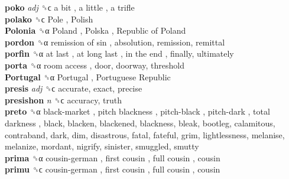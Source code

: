 \textbf{poko} \emph{adj}  ␝ϲ   a bit ,  a little ,  a trifle   \\
\textbf{polako} ␝ϲ   Pole ,  Polish   \\
\textbf{Polonia} ␝α   Poland ,  Polska ,  Republic of Poland   \\
\textbf{pordon} ␝α   remission of sin , absolution, remission, remittal  \\
\textbf{porfin} ␝α   at last ,  at long last ,  in the end , finally, ultimately  \\
\textbf{porta} ␝α   room access , door, doorway, threshold  \\
\textbf{Portugal} ␝α   Portugal ,  Portuguese Republic   \\
\textbf{presis} \emph{adj}  ␝ϲ  accurate, exact, precise  \\
\textbf{presishon} \emph{n}  ␝ϲ  accuracy, truth  \\
\textbf{preto} ␝α   black-market ,  pitch blackness ,  pitch-black ,  pitch-dark ,  total darkness , black, blacken, blackened, blackness, bleak, bootleg, calamitous, contraband, dark, dim, disastrous, fatal, fateful, grim, lightlessness, melanise, melanize, mordant, nigrify, sinister, smuggled, smutty  \\
\textbf{prima} ␝α   cousin-german ,  first cousin ,  full cousin , cousin  \\
\textbf{primu} ␝ϲ   cousin-german ,  first cousin ,  full cousin , cousin  \\
